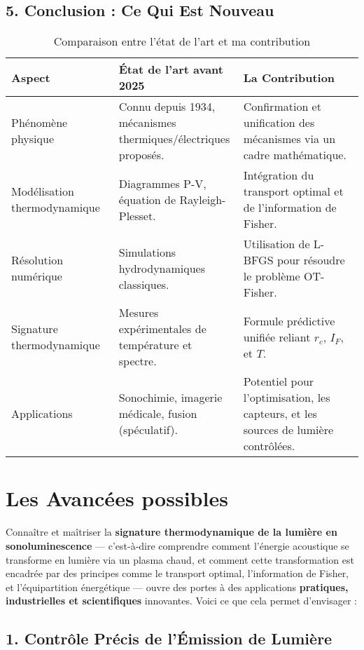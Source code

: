 \documentclass[a4paper,12pt]{article}
\begin{document}
\subsection*{5. Conclusion : Ce Qui Est Nouveau}
\begin{table}[h]
\centering
\caption{Comparaison entre l'état de l'art et ma contribution}
\begin{tabular}{|p{5cm}|p{5cm}|p{5cm}|}
\hline
\textbf{Aspect} & \textbf{État de l’art avant 2025} & \textbf{La Contribution} \\ \hline
Phénomène physique & Connu depuis 1934, mécanismes thermiques/électriques proposés. & Confirmation et unification des mécanismes via un cadre mathématique. \\ \hline
Modélisation thermodynamique & Diagrammes P-V, équation de Rayleigh-Plesset. & Intégration du transport optimal et de l’information de Fisher. \\ \hline
Résolution numérique & Simulations hydrodynamiques classiques. & Utilisation de L-BFGS pour résoudre le problème OT-Fisher. \\ \hline
Signature thermodynamique & Mesures expérimentales de température et spectre. & Formule prédictive unifiée reliant \( r_c \), \( I_F \), et \( T \). \\ \hline
Applications & Sonochimie, imagerie médicale, fusion (spéculatif). & Potentiel pour l’optimisation, les capteurs, et les sources de lumière contrôlées. \\ \hline
\end{tabular}
\end{table}

\newpage
\section{Les Avancées possibles}
Connaître et maîtriser la \textbf{signature thermodynamique de la lumière en sonoluminescence} — c’est-à-dire comprendre comment l’énergie acoustique se transforme en lumière via un plasma chaud, et comment cette transformation est encadrée par des principes comme le transport optimal, l’information de Fisher, et l’équipartition énergétique — ouvre des portes à des applications \textbf{pratiques, industrielles et scientifiques} innovantes. Voici ce que cela permet d’envisager :

\subsection*{1. Contrôle Précis de l’Émission de Lumière}
\end{document}

